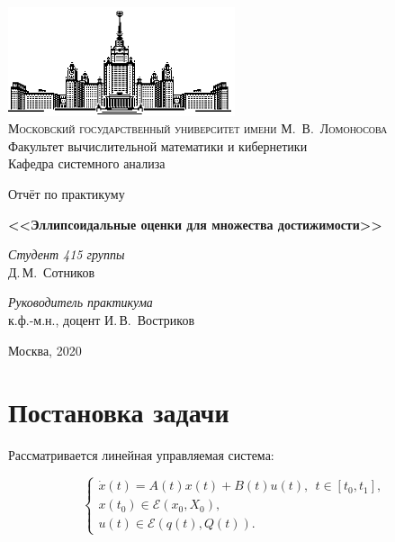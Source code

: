 \documentclass[16pt]{article}
\begin{document}
\thispagestyle{empty}

\begin{center}
\ \vspace{-3cm}

\includegraphics[width=0.5\textwidth]{msu.eps}\\
{\scshape Московский государственный университет имени М.~В.~Ломоносова}\\
Факультет вычислительной математики и кибернетики\\
Кафедра системного анализа

\vfill

{\LARGE Отчёт по практикуму}

\vspace{1cm}

{\Huge\bfseries <<Эллипсоидальные оценки для множества достижимости>>}
\end{center}

\vspace{1cm}

\begin{flushright}
  \large
  \textit{Студент 415 группы}\\
  Д.\,М.~Сотников

  \vspace{5mm}

  \textit{Руководитель практикума}\\
  к.ф.-м.н., доцент И.\,В.~Востриков
\end{flushright}

\vfill

\begin{center}
Москва, 2020
\end{center}

\newpage
\tableofcontents
\newpage
\section{Постановка задачи}
Рассматривается линейная управляемая система:

\begin{equation}\label{task}
\begin{cases}
\dot{x}(t)  = A(t)x(t) + B(t)u(t), \ \ t \in [t_0, t_1],\\
x(t_0) \in \mathcal{E}(x_0, X_0),\\
u(t)\in \mathcal{E}(q(t), Q(t)).
\end{cases}
\end{equation}
\end{document}
